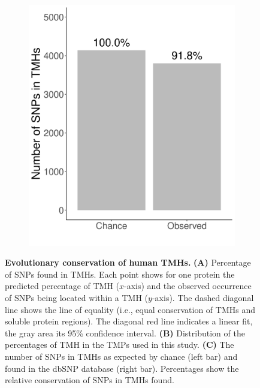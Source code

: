 \begin{figure}[!htbp]
\begin{subfigure}[t]{0.45\textwidth}
    \label{fig:f_tmh_ncbi}
  \end{subfigure}  

  
   \vfill

  \begin{subfigure}[t]{0.45\textwidth}
    \centering
    \caption{}
    \includegraphics[width=\linewidth]{ncbi_peregrine_results/fig_conservation.png}
    \label{fig:conservation}
  \end{subfigure}


  \caption{ \textbf{Evolutionary conservation of human TMHs.}
    \textbf{(A)} 
    Percentage of SNPs found in TMHs.
    Each point shows for one protein the predicted percentage of
    TMH ($x$-axis) and the observed occurrence of SNPs being located
    within a TMH ($y$-axis).
    The dashed diagonal line shows the line of equality (i.e.,
    equal conservation of TMHs and soluble protein regions). 
    The diagonal red line indicates a linear fit, 
    the gray area its 95\% confidence interval.
    \textbf{(B)}
    Distribution of the percentages of TMH in the TMPs used in this study.
    \textbf{(C)}
    The number of SNPs in TMHs as expected by chance (left bar) 
    and found in the dbSNP database (right bar).
    Percentages show the relative conservation
    of SNPs in TMHs found.
  }
\end{figure}

